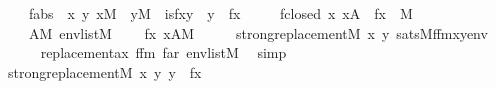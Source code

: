 \begin{isabellebody}
\ \ \ \ fabs{\isacharcolon}{\kern0pt}\ \ {\isachardoublequoteopen}{\isasymAnd}x\ y{\isachardot}{\kern0pt}\ x{\isasymin}M\ {\isasymLongrightarrow}\ y{\isasymin}M\ {\isasymLongrightarrow}\ is{\isacharunderscore}{\kern0pt}f{\isacharparenleft}{\kern0pt}x{\isacharcomma}{\kern0pt}y{\isacharparenright}{\kern0pt}\ {\isasymlongleftrightarrow}\ y\ {\isacharequal}{\kern0pt}\ f{\isacharparenleft}{\kern0pt}x{\isacharparenright}{\kern0pt}{\isachardoublequoteclose}\ \isanewline
\ \ \ \ fclosed{\isacharcolon}{\kern0pt}\ {\isachardoublequoteopen}{\isasymAnd}x{\isachardot}{\kern0pt}\ x{\isasymin}A\ {\isasymLongrightarrow}\ f{\isacharparenleft}{\kern0pt}x{\isacharparenright}{\kern0pt}\ {\isasymin}\ M{\isachardoublequoteclose}\ \ \isanewline
\ \ \ \ {\isachardoublequoteopen}A{\isasymin}M{\isachardoublequoteclose}\ {\isachardoublequoteopen}env{\isasymin}list{\isacharparenleft}{\kern0pt}M{\isacharparenright}{\kern0pt}{\isachardoublequoteclose}\ \isanewline
\ \ \ {\isachardoublequoteopen}{\isacharbraceleft}{\kern0pt}f{\isacharparenleft}{\kern0pt}x{\isacharparenright}{\kern0pt}{\isachardot}{\kern0pt}\ x{\isasymin}A{\isacharbraceright}{\kern0pt}{\isasymin}M{\isachardoublequoteclose}\isanewline
%
\isadelimproof
%
\endisadelimproof
%
\isatagproof
{}\isamarkupfalse%
\ {\isacharminus}{\kern0pt}\isanewline
\ \ \isamarkupfalse%
\ {\isachardoublequoteopen}strong{\isacharunderscore}{\kern0pt}replacement{\isacharparenleft}{\kern0pt}{\isacharhash}{\kern0pt}{\isacharhash}{\kern0pt}M{\isacharcomma}{\kern0pt}\ {\isasymlambda}x\ y{\isachardot}{\kern0pt}\ sats{\isacharparenleft}{\kern0pt}M{\isacharcomma}{\kern0pt}f{\isacharunderscore}{\kern0pt}fm{\isacharcomma}{\kern0pt}{\isacharbrackleft}{\kern0pt}x{\isacharcomma}{\kern0pt}y{\isacharbrackright}{\kern0pt}{\isacharat}{\kern0pt}env{\isacharparenright}{\kern0pt}{\isacharparenright}{\kern0pt}{\isachardoublequoteclose}\isanewline
\ \ \ \ \isamarkupfalse%
\ replacement{\isacharunderscore}{\kern0pt}ax\ f{\isacharunderscore}{\kern0pt}fm\ f{\isacharunderscore}{\kern0pt}ar\ {\isacartoucheopen}env{\isasymin}list{\isacharparenleft}{\kern0pt}M{\isacharparenright}{\kern0pt}{\isacartoucheclose}\ \isamarkupfalse%
\ simp\isanewline
\ \ \isamarkupfalse%
\isanewline
\ \ \isamarkupfalse%
\ {\isachardoublequoteopen}strong{\isacharunderscore}{\kern0pt}replacement{\isacharparenleft}{\kern0pt}{\isacharhash}{\kern0pt}{\isacharhash}{\kern0pt}M{\isacharcomma}{\kern0pt}\ {\isasymlambda}x\ y{\isachardot}{\kern0pt}\ y\ {\isacharequal}{\kern0pt}\ f{\isacharparenleft}{\kern0pt}x{\isacharparenright}{\kern0pt}{\isacharparenright}{\kern0pt}{\isachardoublequoteclose}\isanewline

\end{isabellebody}
